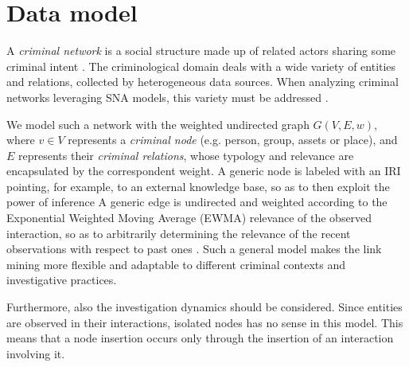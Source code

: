 \section{Data model}
\label{sec:data-model}

A \textit{criminal network} is a social structure made up of related actors sharing some criminal intent \cite{von2001organisierte}. 
The criminological domain deals with a wide variety of entities and relations, collected by heterogeneous data sources. 
When analyzing criminal networks leveraging SNA models, this variety must be addressed \cite{pramanik2016framework}.

We model such a network with the weighted undirected graph $G(V,E,w)$, where $v\in V$ represents a \textit{criminal node} (e.g. person, group, assets or place), and $E$ represents their \textit{criminal relations}, whose typology and relevance are encapsulated by the correspondent weight.
A generic node is labeled with an IRI pointing, for example, to an external knowledge base, so as to then exploit the power of inference
A generic edge is undirected and weighted according to the Exponential Weighted Moving Average (EWMA) relevance of the observed interaction, so as to arbitrarily determining the relevance of the recent observations with respect to past ones \cite{lucas1990exponentially}. 
Such a general model makes the link mining more flexible and adaptable to different criminal contexts and investigative practices.

Furthermore, also the investigation dynamics should be considered. Since entities are observed in their interactions, isolated nodes has no sense in this model. This means that a node insertion occurs only through the insertion of an interaction involving it.


